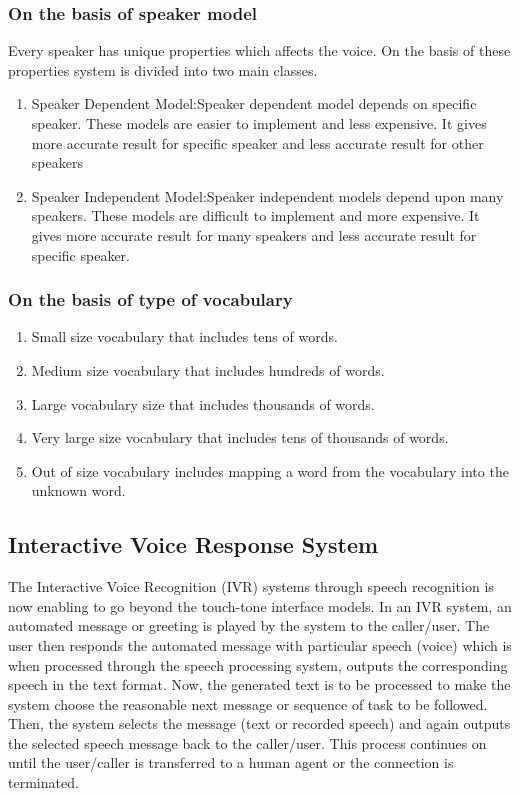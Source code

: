 \subsubsection{On the basis of speaker model}
Every speaker has unique properties which affects the voice. On the basis of these properties system is divided into two main classes.
\begin{enumerate}
	\item Speaker Dependent Model:Speaker dependent model depends on specific speaker. These models are easier to implement and less expensive. It gives more accurate result for specific speaker and less accurate result for other speakers
	\item Speaker Independent Model:Speaker independent models depend upon many speakers. These models are difficult to implement and more expensive. It gives more accurate result for many speakers and less accurate result for specific speaker.
\end{enumerate}

\subsubsection{On the basis of type of vocabulary}
\begin{enumerate}
	\item Small size vocabulary that includes tens of words. 
	\item Medium size vocabulary that includes hundreds of words. 
	\item Large vocabulary size that includes thousands of words. 
	\item Very large size vocabulary that includes tens of thousands of words.
	\item Out of size vocabulary includes mapping a word from the vocabulary into the unknown word.
	
\end{enumerate}

\subsection{Interactive Voice Response System}

The Interactive Voice Recognition (IVR) systems through speech recognition is now enabling to go beyond the touch-tone interface models. In an IVR system, an automated message or greeting is played by the system to the caller/user. The user then responds the automated message with particular speech (voice) which is when processed through the speech processing system, outputs the corresponding speech in the text format. Now, the generated text is to be processed to make the system choose the reasonable next message or sequence of task to be followed. Then, the system selects the message (text or recorded speech) and again outputs the selected speech message back to the caller/user. This process continues on until the user/caller is transferred to a human agent or the connection is terminated. 

